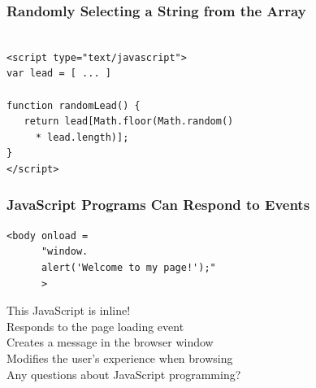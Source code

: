 \documentclass[14pt,aspectratio=169]{beamer}
\begin{document}
%
\begin{frame}[fragile]
  \frametitle{Randomly Selecting a String from the Array}
  \normalsize
  \begin{minipage}{6in}
    \vspace*{.2in}
    \begin{verbatim}

<script type="text/javascript">
var lead = [ ... ]

function randomLead() {
   return lead[Math.floor(Math.random()
     * lead.length)];
}
</script>

    \end{verbatim}
  \end{minipage}
\end{frame}

%
\begin{frame}[fragile]
  \frametitle{JavaScript Programs Can Respond to Events}
  \normalsize
  \begin{minipage}{6in}
    \vspace*{.2in}
    \begin{verbatim}
<body onload =
      "window.
      alert('Welcome to my page!');"
      >
    \end{verbatim}
  \end{minipage}
  \vspace*{.1in}
  \begin{center}
    This JavaScript is inline! \\
    Responds to the page loading event \\
    Creates a message in the browser window \\
    Modifies the user's experience when browsing \\
    Any questions about JavaScript programming? \\
  \end{center}
\end{frame}
\end{document}
